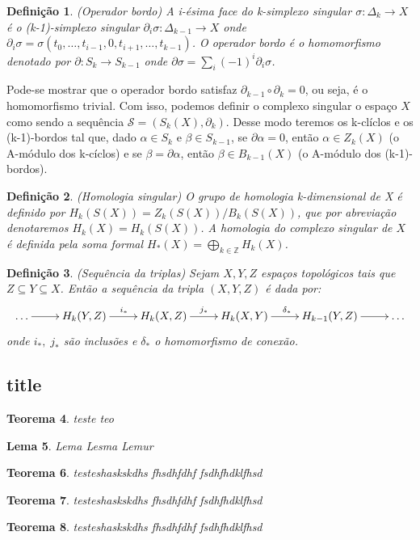 \documentclass[twoside,openright,titlepage,numbers=noenddot,headinclude,  lineheaders footinclude=true,cleardoublepage=empty,
                                BCOR=5mm,paper=a4,fontsize=12pt ]{scrbook}
\newtheorem{teo}{Teorema}[chapter]
\newtheorem{lema}[teo]{Lema}
\newtheorem{defn}[teo]{Definição}
\newcommand{\homologiarel}[3]{H_{#1}(#2,#3)}
\begin{document}
\begin{defn}
	(Operador bordo) A i-ésima face do k-simplexo singular $\sigma: \Delta_{k} \to X$ é o (k-1)-simplexo singular $\partial_{i}\sigma:\Delta_{k-1} \to X$ onde $\partial_{i}\sigma = \sigma(t_{0}, \dots, t_{i-1},0,t_{i+1}, \dots, t_{k-1})$. O operador bordo é o homomorfismo denotado por $\partial : S_{k} \to S_{k-1}$ onde $\partial\sigma = \sum_{i} (-1)^{i}\partial_{i}\sigma$.
\end{defn}
Pode-se mostrar que o operador bordo satisfaz $\partial_{k-1}\circ\partial_{k} = 0$, ou seja, é o homomorfismo trivial. Com isso, podemos definir o complexo singular o espaço $X$ como sendo a sequência $\mathcal{S} = (S_{k}(X), \partial_{k})$. Desse modo teremos os k-clíclos e os (k-1)-bordos tal que, dado $\alpha \in S_{k}$ e $\beta \in S_{k-1}$, se $\partial\alpha = 0$, então $\alpha \in Z_{k}(X)$ (o A-módulo dos k-cíclos) e se $\beta = \partial\alpha$, então $\beta\in B_{k-1}(X)$ (o A-módulo dos (k-1)-bordos).

\begin{defn}
	(Homologia singular) O grupo de homologia k-dimensional de X é definido por $H_{k}(S(X)) = Z_{k}(S(X))/B_{k}(S(X))$, que por abreviação denotaremos $H_{k}(X)=H_{k}(S(X))$. A homologia do complexo singular de $X$ é definida pela soma formal $H_{*}(X) = \bigoplus_{k \in \mathbb{Z}}H_{k}(X)$.
\end{defn}

\begin{defn}
	(Sequência da triplas) Sejam $X, Y, Z$ espaços topológicos tais que $Z \subseteq Y \subseteq X$. Então a sequência da tripla $(X,Y,Z)$ é dada por:
	$$
	\xymatrix{
		\dots \ar[r] & \homologiarel{k}{Y}{Z} \ar[r]^{i_{*}} & \homologiarel{k}{X}{Z} \ar[r]^{j_{*}} & \homologiarel{k}{X}{Y} \ar[r]^{\delta_{*}} & \homologiarel{k-1}{Y}{Z} \ar[r] & \dots
	}
	$$
	onde $i_{*},\;j_{*}$ são inclusões e $\delta_{*}$ o homomorfismo de conexão.
\end{defn}


\subsection{title}
\begin{teo}
 teste teo \blindtext 
\end{teo}
\begin{lema}
 Lema Lesma Lemur
\end{lema}

\begin{teo}
 testeshaskskdhs fhsdhfdhf fsdhfhdklfhsd
\end{teo}
\begin{teo}
 testeshaskskdhs fhsdhfdhf fsdhfhdklfhsd
\end{teo}\begin{teo}
 testeshaskskdhs fhsdhfdhf fsdhfhdklfhsd
\end{teo}
\end{document}
